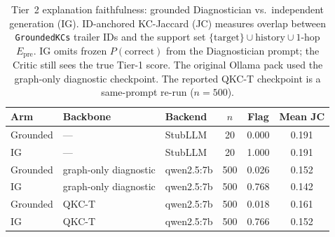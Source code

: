 ﻿%
\begin{table}[t]
\caption{Tier~2 explanation faithfulness: grounded Diagnostician vs.\ independent
generation (IG). ID-anchored KC-Jaccard (JC) measures overlap between
\texttt{GroundedKCs} trailer IDs and the support set
$\{\mathrm{target}\}\cup\mathrm{history}\cup 1$-hop $E_{\mathrm{pre}}$.
IG omits frozen $P(\mathrm{correct})$ from the Diagnostician prompt; the Critic
still sees the true Tier-1 score. The original Ollama pack used the graph-only diagnostic
checkpoint. The reported QKC-T checkpoint is a same-prompt re-run
($n{=}500$).}
\label{tab:kc-jaccard-ig}
\centering
\footnotesize
\begin{tabular}{@{}lllccc@{}}
\toprule
Arm & Backbone & Backend & $n$ & Flag & Mean JC \\
\midrule
Grounded & --- & StubLLM & 20 & 0.000 & 0.191 \\
IG & --- & StubLLM & 20 & 1.000 & 0.191 \\
Grounded & graph-only diagnostic & qwen2.5:7b & 500 & 0.026 & 0.152 \\
IG & graph-only diagnostic & qwen2.5:7b & 500 & 0.768 & 0.142 \\
Grounded & QKC-T & qwen2.5:7b & 500 & 0.018 & 0.161 \\
IG & QKC-T & qwen2.5:7b & 500 & 0.766 & 0.152 \\
\bottomrule
\end{tabular}
\end{table}
